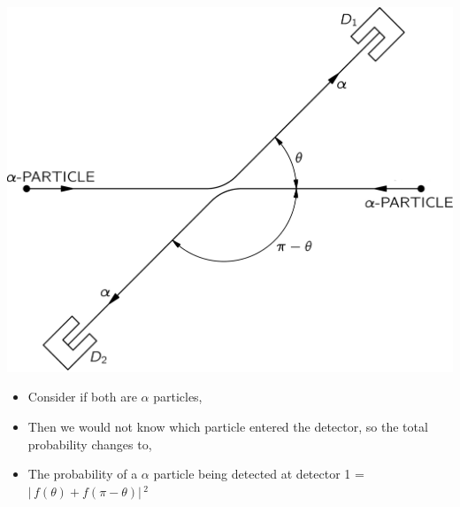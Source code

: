 \documentclass[aspectratio=169]{beamer}
\begin{document}
\begin{frame}

	\begin{multicols}{2}
	
 		 \includegraphics[scale=0.45]{alpha-alpha.png}

 
	\columnbreak
	
		\begin{itemize}

			\item Consider if both are $ \alpha $ particles, \pause \newline
			\item Then we would not know which particle entered the detector, so the total probability changes to,  \pause \newline
			\item  The probability of a $ \alpha $ particle 
		being detected at detector 1 = $ \rvert\,f(\theta) + f(\pi - \theta) \rvert\,^{2} $
		
		\end{itemize}
	
	\end{multicols}
 	
\end{frame}
\end{document}
